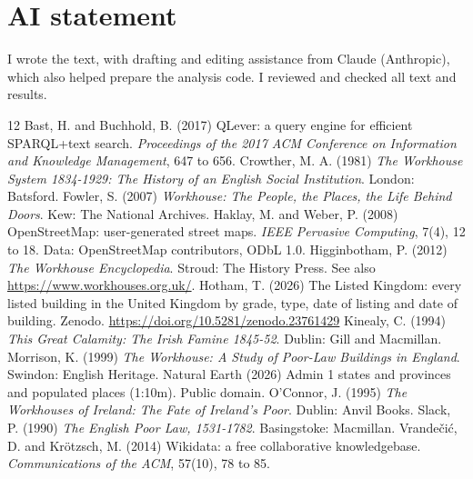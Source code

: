\documentclass[11pt,a4paper]{article}
\begin{document}
\section*{AI statement}
I wrote the text, with drafting and editing assistance from Claude (Anthropic), which also helped prepare the analysis code. I reviewed and checked all text and results.

\begin{thebibliography}{12}
 Bast, H. and Buchhold, B. (2017) QLever: a query engine for efficient SPARQL+text search. \emph{Proceedings of the 2017 ACM Conference on Information and Knowledge Management}, 647 to 656.
 Crowther, M. A. (1981) \emph{The Workhouse System 1834-1929: The History of an English Social Institution}. London: Batsford.
 Fowler, S. (2007) \emph{Workhouse: The People, the Places, the Life Behind Doors}. Kew: The National Archives.
 Haklay, M. and Weber, P. (2008) OpenStreetMap: user-generated street maps. \emph{IEEE Pervasive Computing}, 7(4), 12 to 18. Data: OpenStreetMap contributors, ODbL 1.0.
 Higginbotham, P. (2012) \emph{The Workhouse Encyclopedia}. Stroud: The History Press. See also \url{https://www.workhouses.org.uk/}.
 Hotham, T. (2026) The Listed Kingdom: every listed building in the United Kingdom by grade, type, date of listing and date of building. Zenodo. \url{https://doi.org/10.5281/zenodo.23761429}
 Kinealy, C. (1994) \emph{This Great Calamity: The Irish Famine 1845-52}. Dublin: Gill and Macmillan.
 Morrison, K. (1999) \emph{The Workhouse: A Study of Poor-Law Buildings in England}. Swindon: English Heritage.
 Natural Earth (2026) Admin 1 states and provinces and populated places (1:10m). Public domain.
 O'Connor, J. (1995) \emph{The Workhouses of Ireland: The Fate of Ireland's Poor}. Dublin: Anvil Books.
 Slack, P. (1990) \emph{The English Poor Law, 1531-1782}. Basingstoke: Macmillan.
 Vrande\v{c}i\'{c}, D. and Kr\"{o}tzsch, M. (2014) Wikidata: a free collaborative knowledgebase. \emph{Communications of the ACM}, 57(10), 78 to 85.
\end{thebibliography}
\end{document}
